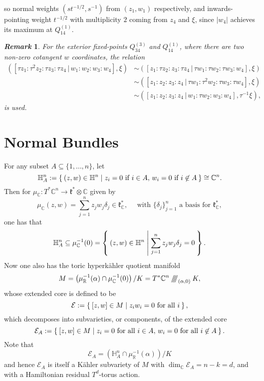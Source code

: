 \documentclass{article}
\newtheorem{remark}{\it Remark\/}
\newcommand{\ra}{\rightarrow}
\newcommand{\K}{K\"ahler }
\newcommand{\HK}{hyperk\"ahler }
\newcommand{\RR}{\mathbb{R}}
\newcommand{\CC}{\mathbb{C}}
\newcommand{\HH}{\mathbb{H}}
\newcommand{\mcE}{\mathcal{E}}
\newcommand{\mf}[1]{\mathfrak{#1}}
\newcommand{\sssslash}{\mathbin{/\mkern-6mu/\mkern-6mu/\mkern-6mu/}}
\begin{document}
\begin{itemize}
		so normal weights $(st^{-1/2}, s^{-1})$ from $(z_{1}, w_{1})$ respectively, and inwards-pointing weight $t^{-1/2}$ with multiplicity $2$ coming from $z_{4}$ and $\xi$, since $|w_{4}|$ achieves its maximum at $Q_{14}^{(1)}$.
		
	\end{itemize}

	\begin{remark}
		For the exterior fixed-points $Q_{34}^{(3)}$ and $Q_{14}^{(1)}$, where there are two non-zero cotangent $w$ coordinates, the relation
		\begin{align*}
			\left( [\tau z_{1} : \tau^{2} z_{2} : \tau z_{3} : \tau z_{4} \, | \, w_{1} : w_{2} : w_{3} : w_{4}], \xi \right) &\sim	\left( [z_{1} : \tau z_{2} : z_{3} : \tau z_{4} \, | \, \tau w_{1} : \tau w_{2} : \tau w_{3} : w_{4}], \xi \right) \\ &\sim \left( [z_{1} : z_{2} : z_{3} : z_{4} \, | \, \tau w_{1} : \tau^{2} w_{2} : \tau w_{3} : \tau w_{4}], \xi \right) \\ &\sim \left( [z_{1} : z_{2} : z_{3} : z_{4} \, | \, w_{1} : \tau w_{2} : w_{3} : w_{4}], \tau^{-1} \xi \right),
		\end{align*}
		is used.
	\end{remark}
	
\section{Normal Bundles}

For any subset $A \subseteq \{1, \ldots, n\}$, let
\[
	\HH_{A}^{n} := \Set{ (z,w) \in \HH^{n} | z_{i} = 0 \text{ if } i \in A,\, w_{i} = 0 \text{ if } i \not\in A } \cong \CC^{n}.
\]
Then for $\mu_{\CC} : T^{\ast}\CC^{n} \ra \mf{k}^{\ast} \otimes \CC$ given by
\[
	\mu_{\CC}(z,w) = \sum_{j=1}^{n} z_{j}w_{j}\delta_{j} \in \mf{k}_{\CC}^{\ast}, \quad \text{ with } \{\delta_{j}\}_{j=1}^{n} \text{ a basis for } \mf{k}_{\CC}^{\ast},
\]
one has that
\[
	\HH_{A}^{n} \subseteq \mu_{\CC}^{-1}(0) = \Set{ (z,w) \in \HH^{n} | \sum_{j=1}^{n} z_{j}w_{j}\delta_{j} = 0 }.
\]
Now one also has the toric \HK quotient manifold
\[
	M = \left(\mu_{\RR}^{-1}(\alpha) \cap \mu_{\CC}^{-1}(0)\right) / K = T^{\ast}\CC^{n} \sssslash_{(\alpha, 0)} K,
\]
whose extended core is defined to be
\[
	\mcE := \Set{ [z,w] \in M | z_{i}w_{i} = 0 \text{ for all } i },
\]
which decomposes into subvarieties, or components, of the extended core
\[
	\mcE_{A} := \Set{[z,w] \in M | z_{i} = 0 \text{ for all } i \in A,\, w_{i} = 0 \text{ for all } i \not\in A}.
\]
Note that
\[
	\mcE_{A} = \left(\HH_{A}^{n} \cap \mu_{\RR}^{-1}(\alpha) \right)  / K
\]
and hence $\mcE_{A}$ is itself a \K subvariety of $M$ with $\dim_{\CC}\mcE_{A} = n - k = d$, and with a Hamiltonian residual $T^{d}$-torus action.
\end{document}
